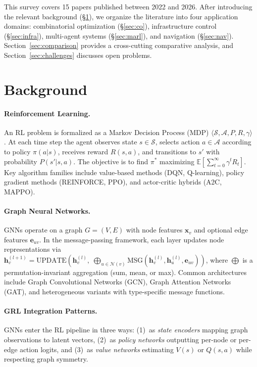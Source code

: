 \documentclass{article}
\begin{document}
This survey covers 15 papers published between 2022 and 2026. After introducing the relevant background (\S\ref{sec:bg}), we organize the literature into four application domains: combinatorial optimization (\S\ref{sec:co}), infrastructure control (\S\ref{sec:infra}), multi-agent systems (\S\ref{sec:marl}), and navigation (\S\ref{sec:nav}). Section~\ref{sec:comparison} provides a cross-cutting comparative analysis, and Section~\ref{sec:challenges} discusses open problems.

\section{Background}\label{sec:bg}

\paragraph{Reinforcement Learning.}
An RL problem is formalized as a Markov Decision Process (MDP) $\langle \mathcal{S}, \mathcal{A}, P, R, \gamma \rangle$. At each time step the agent observes state $s \in \mathcal{S}$, selects action $a \in \mathcal{A}$ according to policy $\pi(a|s)$, receives reward $R(s,a)$, and transitions to $s'$ with probability $P(s'|s,a)$. The objective is to find $\pi^*$ maximizing $\mathbb{E}[\sum_{t=0}^{\infty}\gamma^t R_t]$. Key algorithm families include value-based methods (DQN, Q-learning), policy gradient methods (REINFORCE, PPO), and actor-critic hybrids (A2C, MAPPO).

\paragraph{Graph Neural Networks.}
GNNs operate on a graph $G=(V,E)$ with node features $\mathbf{x}_v$ and optional edge features $\mathbf{e}_{uv}$. In the message-passing framework, each layer updates node representations via $\mathbf{h}_v^{(l+1)} = \text{UPDATE}(\mathbf{h}_v^{(l)},\; \bigoplus_{u \in \mathcal{N}(v)} \text{MSG}(\mathbf{h}_v^{(l)}, \mathbf{h}_u^{(l)}, \mathbf{e}_{uv}))$, where $\bigoplus$ is a permutation-invariant aggregation (sum, mean, or max). Common architectures include Graph Convolutional Networks (GCN), Graph Attention Networks (GAT), and heterogeneous variants with type-specific message functions.

\paragraph{GRL Integration Patterns.}
GNNs enter the RL pipeline in three ways: (1)~as \emph{state encoders} mapping graph observations to latent vectors, (2)~as \emph{policy networks} outputting per-node or per-edge action logits, and (3)~as \emph{value networks} estimating $V(s)$ or $Q(s,a)$ while respecting graph symmetry.
\end{document}
